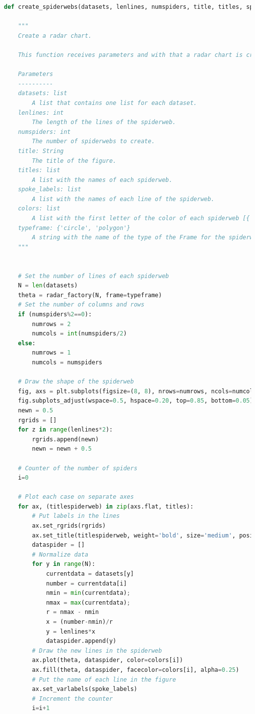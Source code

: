 \begin{lstlisting}[language=Python, caption=Procedimiento del segundo paso, label=lst:c3]
def create_spiderwebs(datasets, lenlines, numspiders, title, titles, spoke_labels, colors, typeframe):

    """
    Create a radar chart.

    This function receives parameters and with that a radar chart is created.

    Parameters
    ----------
    datasets: list
        A list that contains one list for each dataset.
    lenlines: int
        The length of the lines of the spiderweb.
    numspiders: int
        The number of spiderwebs to create.
    title: String
        The title of the figure.
    titles: list
        A list with the names of each spiderweb.
    spoke_labels: list
        A list with the names of each line of the spiderweb.
    colors: list    
        A list with the first letter of the color of each spiderweb [{'b', 'r', 'g', 'm', 'y'}].
    typeframe: {'circle', 'polygon'}
        A string with the name of the type of the Frame for the spiderwebs.
    """


    # Set the number of lines of each spiderweb
    N = len(datasets)
    theta = radar_factory(N, frame=typeframe)
    # Set the number of columns and rows
    if (numspiders%2==0):
        numrows = 2
        numcols = int(numspiders/2)
    else:
        numrows = 1
        numcols = numspiders
        
    # Draw the shape of the spiderweb
    fig, axs = plt.subplots(figsize=(8, 8), nrows=numrows, ncols=numcols, subplot_kw=dict(projection='radar'))
    fig.subplots_adjust(wspace=0.5, hspace=0.20, top=0.85, bottom=0.05)
    newn = 0.5
    rgrids = []
    for z in range(lenlines*2):
        rgrids.append(newn)
        newn = newn + 0.5

    # Counter of the number of spiders
    i=0

    # Plot each case on separate axes
    for ax, (titlespiderweb) in zip(axs.flat, titles):
        # Put labels in the lines
        ax.set_rgrids(rgrids)        
        ax.set_title(titlespiderweb, weight='bold', size='medium', position=(0.5, 1.1), horizontalalignment='center', verticalalignment='center')
        dataspider = []
        # Normalize data
        for y in range(N):
            currentdata = datasets[y]
            number = currentdata[i]
            nmin = min(currentdata);
            nmax = max(currentdata);
            r = nmax - nmin
            x = (number-nmin)/r
            y = lenlines*x
            dataspider.append(y)
        # Draw the new lines in the spiderweb
        ax.plot(theta, dataspider, color=colors[i])
        ax.fill(theta, dataspider, facecolor=colors[i], alpha=0.25)
        # Put the name of each line in the figure
        ax.set_varlabels(spoke_labels)
        # Increment the counter
        i=i+1
        

\end{lstlisting}

